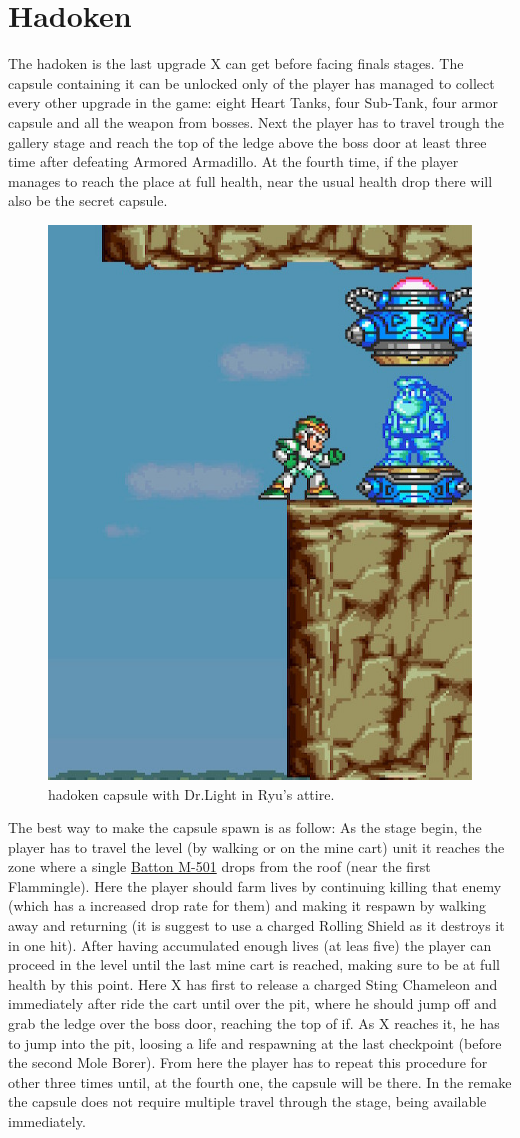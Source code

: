 \section{Hadoken}\label{hadoken}
The hadoken is the last upgrade X can get before facing finals stages. The capsule containing it can be unlocked only of the player has managed to collect every other upgrade in the game: eight Heart Tanks, four Sub-Tank, four armor capsule and all the weapon from bosses. Next the player has to travel trough the gallery stage and reach the top of the ledge above the boss door at least three time after defeating Armored Armadillo. At the fourth time, if the player manages to reach the place at full health, near the usual health drop there will also be the secret capsule.
\begin{figure}[htp]
	\centering
	\includegraphics[width=0.3\linewidth]{figures/X1/Armored_armadillo/Armadillo_hadoken.jpg}
	\caption{hadoken capsule with Dr.Light in Ryu's attire.}
\end{figure}
The best way to make the capsule spawn is as follow: As the stage begin, the player has to travel the level (by walking or on the mine cart) unit it reaches the zone where a single \hyperlink{enem:Batton_M-501}{Batton M-501} drops from the roof (near the first Flammingle). Here the player should farm lives by continuing killing that enemy (which has a increased drop rate for them)  and making it respawn by walking away and returning (it is suggest to use a charged Rolling Shield as it destroys it in one hit). After having accumulated enough lives (at leas five) the player can proceed in the level until the last mine cart is reached, making sure to be at full health by this point. Here X has first to release a charged Sting Chameleon and immediately after ride the cart until over the pit, where he should jump off and grab the ledge over the boss door, reaching the top of if. As X reaches it, he has to jump into the pit, loosing a life and respawning at the last checkpoint (before the second Mole Borer). From here the player has to repeat this procedure for other three times until, at the  fourth one, the capsule will be there. In the remake the capsule does not require multiple travel through the stage, being available immediately.

